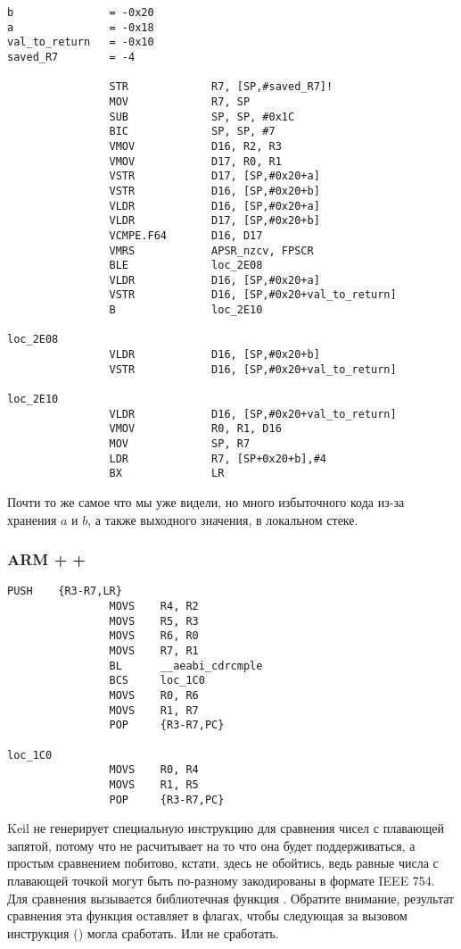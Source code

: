 \begin{lstlisting}[caption=\NonOptimizingXcode + \ARMMode]
b               = -0x20
a               = -0x18
val_to_return   = -0x10
saved_R7        = -4

                STR             R7, [SP,#saved_R7]!
                MOV             R7, SP
                SUB             SP, SP, #0x1C
                BIC             SP, SP, #7
                VMOV            D16, R2, R3
                VMOV            D17, R0, R1
                VSTR            D17, [SP,#0x20+a]
                VSTR            D16, [SP,#0x20+b]
                VLDR            D16, [SP,#0x20+a]
                VLDR            D17, [SP,#0x20+b]
                VCMPE.F64       D16, D17
                VMRS            APSR_nzcv, FPSCR
                BLE             loc_2E08
                VLDR            D16, [SP,#0x20+a]
                VSTR            D16, [SP,#0x20+val_to_return]
                B               loc_2E10

loc_2E08
                VLDR            D16, [SP,#0x20+b]
                VSTR            D16, [SP,#0x20+val_to_return]

loc_2E10
                VLDR            D16, [SP,#0x20+val_to_return]
                VMOV            R0, R1, D16
                MOV             SP, R7
                LDR             R7, [SP+0x20+b],#4
                BX              LR
\end{lstlisting}

Почти то же самое что мы уже видели, но много избыточного кода из-за хранения $a$ и $b$, а также 
выходного значения, в локальном стеке.

\subsubsection{ARM + \OptimizingKeil + \ThumbMode}

\begin{lstlisting}[caption=\OptimizingKeil + \ThumbMode]
                PUSH    {R3-R7,LR}
                MOVS    R4, R2
                MOVS    R5, R3
                MOVS    R6, R0
                MOVS    R7, R1
                BL      __aeabi_cdrcmple
                BCS     loc_1C0
                MOVS    R0, R6
                MOVS    R1, R7
                POP     {R3-R7,PC}

loc_1C0
                MOVS    R0, R4
                MOVS    R1, R5
                POP     {R3-R7,PC}
\end{lstlisting}

Keil не генерирует специальную инструкцию для сравнения чисел с плавающей запятой, потому что не 
расчитывает на то что она будет поддерживаться, а простым сравнением побитово, кстати, здесь не обойтись,
ведь равные числа с плавающей точкой могут быть по-разному закодированы в формате IEEE 754. 
Для сравнения вызывается библиотечная функция . Обратите внимание, результат
сравнения эта функция оставляет в флагах, чтобы следующая за вызовом инструкция  () могла сработать. Или не сработать.

 

